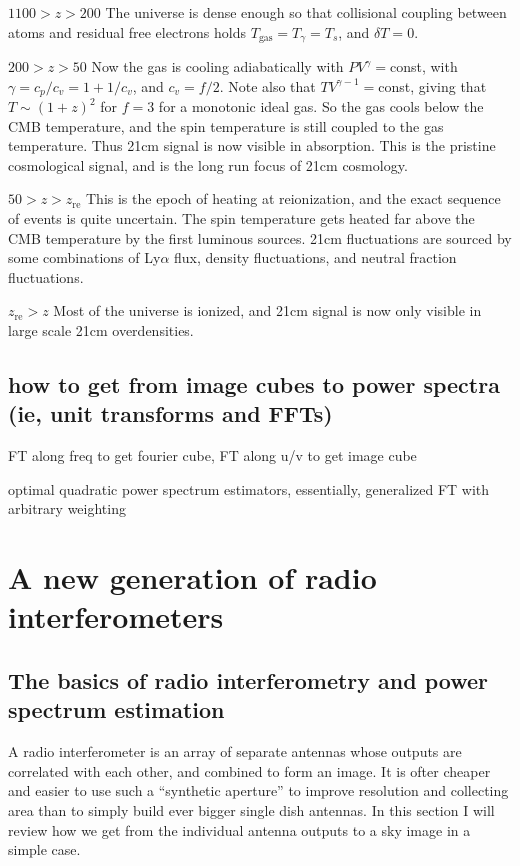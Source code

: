 $1100>z>200$
The universe is dense enough so that collisional coupling between atoms and residual free electrons holds $T_\text{gas}=T_\gamma=T_s$, and $\delta T=0$.

$200>z>50$
Now the gas is cooling adiabatically with $PV^\gamma=$const, with $\gamma=c_p/c_v=1+1/c_v$, and $c_v=f/2$. Note also that $TV^{\gamma-1}=$const, giving that $T\sim (1+z)^2$ for $f=3$ for a monotonic ideal gas. So the gas cools below the CMB temperature, and the spin temperature is still coupled to the gas temperature. Thus 21cm signal is now visible in absorption. This is the pristine cosmological signal, and is the long run focus of 21cm cosmology.

$50>z>z_\text{re}$
This is the epoch of heating at reionization, and the exact sequence of events is quite uncertain. The spin temperature gets heated far above the CMB temperature by the first luminous sources. 21cm fluctuations are sourced by some combinations of Ly$\alpha$ flux, density fluctuations, and neutral fraction fluctuations.  

$z_\text{re}>z$
Most of the universe is ionized, and 21cm signal is now only visible in large scale 21cm overdensities. 


\subsection{how to get from image cubes to power spectra (ie, unit transforms and FFTs)}

FT along freq to get fourier cube,
FT along u/v to get image cube 

optimal quadratic power spectrum estimators, essentially, generalized FT with arbitrary weighting


\section{A new generation of radio interferometers}

\subsection{The basics of radio interferometry and power spectrum estimation}

A radio interferometer is an array of separate antennas whose outputs are correlated with each other, and combined to form an image. It is ofter cheaper and easier to use such a ``synthetic aperture'' to improve resolution and collecting area than to simply build ever bigger single dish antennas. In this section I will review how we get from the individual antenna outputs to a sky image in a simple case.

